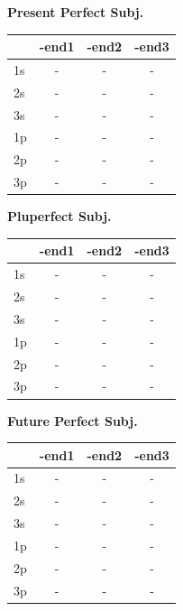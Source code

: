 \documentclass{book}
\begin{document}
\vspace{0.5cm}
\noindent
\begin{minipage}{0.32\textwidth}
\centering
\textbf{Present Perfect Subj.} \\ \vspace{0.1cm}
\begin{tabular}{lccc} \toprule & -end1 & -end2 & -end3 \\ \midrule 1s & - & - & - \\ 2s & - & - & - \\ 3s & - & - & - \\ 1p & - & - & - \\ 2p & - & - & - \\ 3p & - & - & - \\ \bottomrule \end{tabular}
\end{minipage}\hfill
\begin{minipage}{0.32\textwidth}
\centering
\textbf{Pluperfect Subj.} \\ \vspace{0.1cm}
\begin{tabular}{lccc} \toprule & -end1 & -end2 & -end3 \\ \midrule 1s & - & - & - \\ 2s & - & - & - \\ 3s & - & - & - \\ 1p & - & - & - \\ 2p & - & - & - \\ 3p & - & - & - \\ \bottomrule \end{tabular}
\end{minipage}\hfill
\begin{minipage}{0.32\textwidth}
\centering
\textbf{Future Perfect Subj.} \\ \vspace{0.1cm}
\begin{tabular}{lccc} \toprule & -end1 & -end2 & -end3 \\ \midrule 1s & - & - & - \\ 2s & - & - & - \\ 3s & - & - & - \\ 1p & - & - & - \\ 2p & - & - & - \\ 3p & - & - & - \\ \bottomrule \end{tabular}
\end{minipage}

\vspace{0.8cm}
\end{document}
